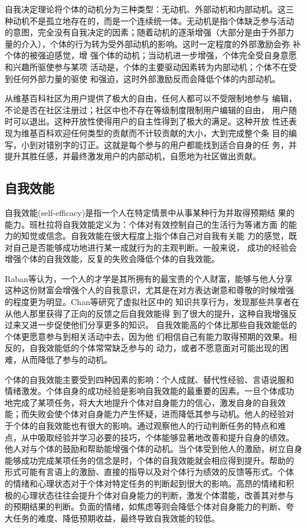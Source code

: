 自我决定理论将个体的动机分为三种类型：无动机、外部动机和内部动机。这三
种动机不是孤立地存在的，而是一个连续统一体。无动机是指个体缺乏参与活动
的意图，完全没有自我决定的因素；随着动机的逐渐增强（大部分是由于外部力
量的介入），个体的行为转为受外部动机的影响。这时一定程度的外部激励会弥
补个体的被强迫感觉，增
强个体的动机；当动机进一步增强，个体完全受自身意愿和兴趣所驱使参与某项
活动是，个体的主要驱动因素转为内部动机；个体不在受到任何外部力量的驱使
和强迫，这时外部激励反而会降低个体的内部动机。

从维基百科社区为用户提供了极大的自由，任何人都可以不受限制地参与
编辑，不论是否在社区注册过；社区中也不存在等级制度限制用户编辑的自由，
用户随时可以退出。这种开放性使得用户的自主性得到了极大的满足。这种开放
性还表现为维基百科欢迎任何类型的贡献而不计较贡献的大小，大到完成整个条
目的编写，小到对错别字的订正。这就是每个参与的用户都能找到适合自身的任
务，并提升其胜任感，并最终激发用户的内部动机，自愿地为社区做出贡献。

\subsection{自我效能}
\label{sec:self-efficacy}

自我效能(self-efficacy)是指一个人在特定情景中从事某种行为并取得预期结
果的能力。班杜拉将自我效能定义为：个体对有效控制自己的生活行为等诸方面
的能力的知觉或信念\cite{}。自我效能在很大程度上指个体自己对自我有关能
力的感觉，既对自己是否能够成功地进行某一成就行为的主观判断。一般来说，
成功的经验会增强个体的自我效能，反复的失败会降低个体的自我效能。

Raban等认为，一个人的才学是其所拥有的最宝贵的个人财富，能够与他人分享
这种这份财富会增强个人的自我意识，尤其是在对方表达谢意和尊敬的时候增强
的程度更为明显\cite{raban2007investigating}。Chan等研究了虚拟社区中的
知识共享行为，发现那些共享者在从他人那里获得了正向的反馈之后自我效能得
到了很大的提升，这种自我增强反过来又进一步促使他们分享更多的知识。
自我效能高的个体比那些自我效能低的个体更愿意参与到相关活动中去，因为他
们相信自己有能力取得预期的效果。相反的，自我效能低的个体常常缺乏参与的
动力，或者不愿意面对可能出现的困难，从而降低了参与的动机。

个体的自我效能主要受到四种因素的影响：个人成就、替代性经验、言语说服和
情绪激发。个体自身的成功经验是影响自我效能的最重要的因素。一旦个体成功
地完成了某项任务，将大大地提升个体对自身能力的信心，激发自身的自我效
能；而失败会使个体对自身能力产生怀疑，进而降低其参与动机。他人的经验对
于个体的自我效能也有很大的影响。通过观察他人的行动判断任务的特点和难
点，从中吸取经验并学习必要的技巧，个体能够显著地改善和提升自身的绩效。
他人对与个体的鼓励和帮助能增强个体的动机。当个体受到他人的激励，树立自身
能够成功完成某项任务的信念是时，个体的自我效能就会相应得到提升。帮助的
形式可能有言语上的激励、直接的指导以及对个体行为绩效的反馈等形式。个体
的情绪和心理状态对于个体对特定任务的判断起到很大的影响。高昂的情绪和积
极的心理状态往往会提升个体对自身能力的判断，激发个体潜能，改善其对参与
的预期结果的判断。负面的情绪，如焦虑等则会降低个体对自身能力的判断、夸
大任务的难度、降低预期收益，最终导致自我效能的较低。

